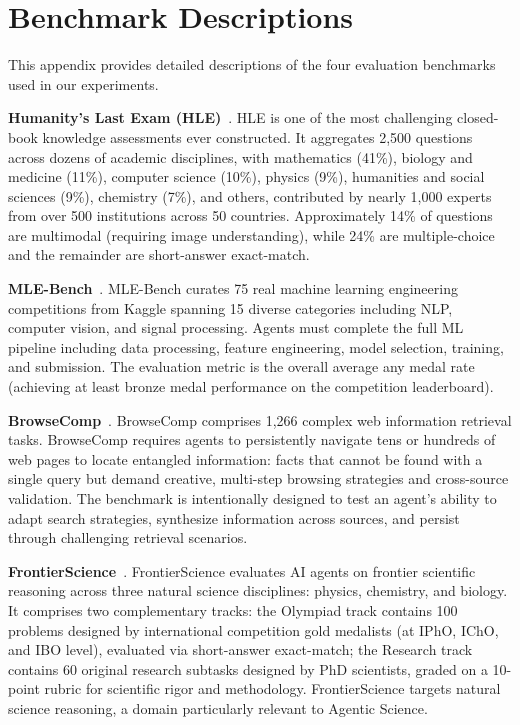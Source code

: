 \documentclass[11pt, a4paper, logo, copyright, nonumbering]{cls/Sci}
\begin{document}
\newpage

\appendix

\section{Benchmark Descriptions}
\label{sec:benchmark_details}

This appendix provides detailed descriptions of the four evaluation benchmarks used in our experiments.

\textbf{Humanity's Last Exam (HLE)}~\citep{hle2025}. HLE is one of the most challenging closed-book knowledge assessments ever constructed. It aggregates 2,500 questions across dozens of academic disciplines, with mathematics (41\%), biology and medicine (11\%), computer science (10\%), physics (9\%), humanities and social sciences (9\%), chemistry (7\%), and others, contributed by nearly 1,000 experts from over 500 institutions across 50 countries. Approximately 14\% of questions are multimodal (requiring image understanding), while 24\% are multiple-choice and the remainder are short-answer exact-match.

\textbf{MLE-Bench}~\citep{chan2024mlebench}. MLE-Bench curates 75 real machine learning engineering competitions from Kaggle spanning 15 diverse categories including NLP, computer vision, and signal processing. Agents must complete the full ML pipeline including data processing, feature engineering, model selection, training, and submission. The evaluation metric is the overall average any medal rate (achieving at least bronze medal performance on the competition leaderboard).

\textbf{BrowseComp}~\citep{wei2025browsecomp}. BrowseComp comprises 1,266 complex web information retrieval tasks. BrowseComp requires agents to persistently navigate tens or hundreds of web pages to locate entangled information: facts that cannot be found with a single query but demand creative, multi-step browsing strategies and cross-source validation. The benchmark is intentionally designed to test an agent's ability to adapt search strategies, synthesize information across sources, and persist through challenging retrieval scenarios.

\textbf{FrontierScience}~\citep{openai2026frontierscience}. FrontierScience evaluates AI agents on frontier scientific reasoning across three natural science disciplines: physics, chemistry, and biology. It comprises two complementary tracks: the Olympiad track contains 100 problems designed by international competition gold medalists (at IPhO, IChO, and IBO level), evaluated via short-answer exact-match; the Research track contains 60 original research subtasks designed by PhD scientists, graded on a 10-point rubric for scientific rigor and methodology. FrontierScience targets natural science reasoning, a domain particularly relevant to Agentic Science.

\newpage

\end{document}
